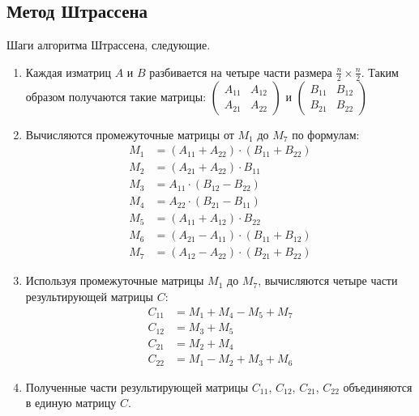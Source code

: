 \documentclass[12pt, a4paper]{article}
\begin{document}
\subsection{Метод Штрассена}
Шаги алгоритма Штрассена, следующие.
\begin{enumerate}
    \item Каждая изматриц $A$ и $B$ разбивается на четыре части размера $\frac{n}{2} \times \frac{n}{2}$. Таким образом получаются такие матрицы: 
    $\begin{pmatrix}
      A_{11} & A_{12}\\
      A_{21} & A_{22}
    \end{pmatrix}$
    и 
    $\begin{pmatrix}
      B_{11} & B_{12}\\
      B_{21} & B_{22}
    \end{pmatrix}$
    \item Вычисляются промежуточные матрицы от $M_1$ до $M_7$ по формулам:
    \begin{align*}
      M_1 &= (A_{11} + A_{22}) \cdot (B_{11} + B_{22}) \\
      M_2 &= (A_{21} + A_{22}) \cdot B_{11} \\
      M_3 &= A_{11} \cdot (B_{12} - B_{22}) \\
      M_4 &= A_{22} \cdot (B_{21} - B_{11}) \\
      M_5 &= (A_{11} + A_{12}) \cdot B_{22} \\
      M_6 &= (A_{21} - A_{11}) \cdot (B_{11} + B_{12}) \\ 
      M_7 &= (A_{12} - A_{22}) \cdot (B_{21} + B_{22})
    \end{align*}
    \item Используя промежуточные матрицы $M_1$ до $M_7$, вычисляются четыре части результирующей матрицы $C$:
    \begin{align*}
      C_{11} &= M_1 + M_4 - M_5 + M_7 \\
      C_{12} &= M_3 + M_5 \\
      C_{21} &= M_2 + M_4 \\
      C_{22} &= M_1 - M_2 + M_3 + M_6
    \end{align*}
    \item Полученные части результирующей матрицы $C_{11}$, $C_{12}$, $C_{21}$, $C_{22}$ объединяются в единую матрицу $C$.
\end{enumerate}
\end{document}
